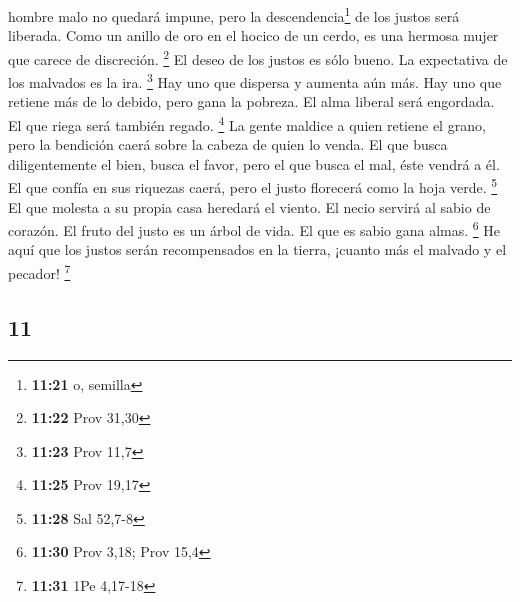\begin{paracol}{2}
hombre malo no quedará impune, pero la descendencia\footnote{\textbf{11:21}
  o, semilla} de los justos será liberada.  Como un
anillo de oro en el hocico de un cerdo, es una hermosa mujer que carece
de discreción. \footnote{\textbf{11:22} Prov 31,30}  El
deseo de los justos es sólo bueno. La expectativa de los malvados es la
ira. \footnote{\textbf{11:23} Prov 11,7}  Hay uno que
dispersa y aumenta aún más. Hay uno que retiene más de lo debido, pero
gana la pobreza.  El alma liberal será engordada. El que
riega será también regado. \footnote{\textbf{11:25} Prov 19,17}
 La gente maldice a quien retiene el grano, pero la
bendición caerá sobre la cabeza de quien lo venda.  El
que busca diligentemente el bien, busca el favor, pero el que busca el
mal, éste vendrá a él.  El que confía en sus riquezas
caerá, pero el justo florecerá como la hoja verde. \footnote{\textbf{11:28}
  Sal 52,7-8}  El que molesta a su propia casa heredará
el viento. El necio servirá al sabio de corazón.  El
fruto del justo es un árbol de vida. El que es sabio gana almas.
\footnote{\textbf{11:30} Prov 3,18; Prov 15,4}  He aquí
que los justos serán recompensados en la tierra, ¡cuanto más el malvado
y el pecador! \footnote{\textbf{11:31} 1Pe 4,17-18}

\switchcolumn
\begin{otherlanguage}{english}

\hypertarget{section-21}{%
\section{11}\label{section-21}}


\end{otherlanguage}
\end{paracol}
